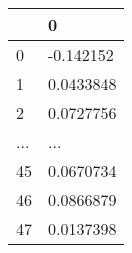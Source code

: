 \begin{tabular}{ll}
\toprule
{} &          0 \\
\midrule
0   &  -0.142152 \\
1   &  0.0433848 \\
2   &  0.0727756 \\
... &        ... \\
45  &  0.0670734 \\
46  &  0.0866879 \\
47  &  0.0137398 \\
\bottomrule
\end{tabular}
